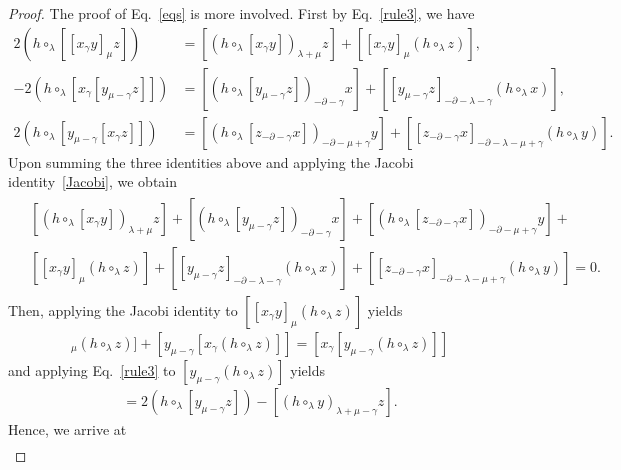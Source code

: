 \documentclass[11pt,letterpaper,reqno]{amsart}
\theoremstyle{definition}
\numberwithin{equation}{section}
\begin{document}
\begin{proof}
The proof of Eq.~\eqref{eqs} is more involved. First by Eq.~\eqref{rule3}, we have
   \begin{align*}
      2(h\circ_{\lambda}[[x_{\gamma}y]_{\mu}z])&=[(h\circ_{\lambda}[x_{\gamma}y])_{\lambda+\mu}z]+[[x_{\gamma}y]_{\mu}(h\circ_{\lambda}z)],\\
      -2(h\circ_{\lambda}[x_{\gamma}[y_{\mu-\gamma}z]])&=[(h\circ_{\lambda}[y_{\mu-\gamma}z])_{-\partial-\gamma}x]+[[y_{\mu-\gamma}z]_{-\partial-\lambda-\gamma}(h\circ_{\lambda}x)],\\
      2(h\circ_{\lambda}[y_{\mu-\gamma}[x_{\gamma}z]])&=[(h\circ_{\lambda}[z_{-\partial-\gamma}x])_{-\partial-\mu+\gamma}y]+[[z_{-\partial-\gamma}x]_{-\partial-\lambda-\mu+\gamma}(h\circ_{\lambda}y)].
   \end{align*}
Upon summing the three identities above and applying the Jacobi identity~\eqref{Jacobi}, we obtain
   \begin{eqnarray}\label{Id1}
      \begin{aligned}
      &[(h\circ_{\lambda}[x_{\gamma}y])_{\lambda+\mu}z]+[(h\circ_{\lambda}[y_{\mu-\gamma}z])_{-\partial-\gamma}x]+[(h\circ_{\lambda}[z_{-\partial-\gamma}x])_{-\partial-\mu+\gamma}y]+ \\
      &[[x_{\gamma}y]_{\mu}(h\circ_{\lambda}z)]+[[y_{\mu-\gamma}z]_{-\partial-\lambda-\gamma}(h\circ_{\lambda}x)]+[[z_{-\partial-\gamma}x]_{-\partial-\lambda-\mu+\gamma}(h\circ_{\lambda}y)]=0.
      \end{aligned}
   \end{eqnarray}
Then, applying the Jacobi identity to $[[x_{\gamma}y]_{\mu}(h\circ_{\lambda}z)]$ yields
   \begin{align*}
      [[x_{\gamma}y]_{\mu}(h\circ_{\lambda}z)]+[y_{\mu-\gamma}[x_{\gamma}(h\circ_{\lambda}z)]]=[x_{\gamma}[y_{\mu-\gamma}(h\circ_{\lambda}z)]]
   \end{align*}
and applying Eq.~\eqref{rule3} to $[y_{\mu-\gamma}(h\circ_{\lambda}z)]$ yields
   \begin{align*}
      [y_{\mu-\gamma}(h\circ_{\lambda}z)]=2\left(h\circ_{\lambda}[y_{\mu-\gamma}z]\right)-[(h\circ_{\lambda}y)_{\lambda+\mu-\gamma}z].
   \end{align*}
Hence, we arrive at
   \begin{align*}

\end{align*}
\end{proof}
\end{document}

